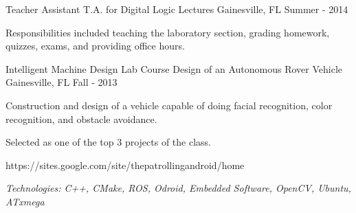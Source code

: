 \begin{cventries}
	\cventry
		{Teacher Assistant} %
		{T.A. for Digital Logic Lectures} %
		{Gainesville, FL} %
		{Summer - 2014} %
		{
			\begin{cvitems} %
			\item {Responsibilities included teaching the laboratory section, grading homework, quizzes, exams, and providing office hours.}
			\end{cvitems}
		}

	\cventry
		{Intelligent Machine Design Lab Course} %
		{Design of an Autonomous Rover Vehicle} %
		{Gainesville, FL} %
		{Fall - 2013} %
		{
			\begin{cvitems} %
				\item {Construction and design of a vehicle capable of doing facial recognition, color recognition, and
					obstacle avoidance.}
        \item {Selected as one of the top 3 projects of the class.}
        \item {https://sites.google.com/site/thepatrollingandroid/home}
				\item {\it{Technologies:} C++, CMake, ROS, Odroid, Embedded Software, OpenCV, Ubuntu, ATxmega}
			\end{cvitems}
		}

\end{cventries}
